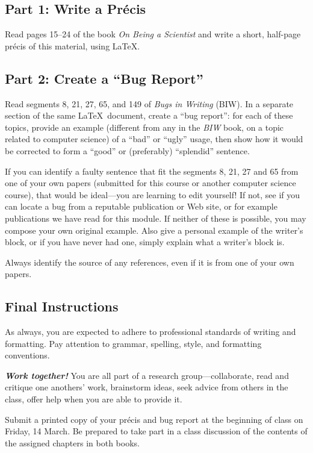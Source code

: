 
\usepackage[compact]{titlesec}




\subsection*{Part 1: Write a Pr\'{e}cis}
Read pages 15--24 of the book {\em On Being a Scientist} and write a short,
half-page pr\'{e}cis of this material, using \LaTeX.

\subsection*{Part 2: Create a ``Bug Report''}
Read segments 8, 21, 27, 65, and 149 of {\em Bugs in Writing} (BIW). 
In a separate section of the same \LaTeX\ document, create a
``bug report'': for each
of these topics, provide an example (different from any in the {\em BIW}
book, on a topic
related to computer science) of a ``bad'' or ``ugly'' usage, then show
how it would be corrected to form a ``good'' or (preferably) ``splendid''
sentence.

If you can identify a faulty sentence that fit the segments 8, 21, 27 and 65 from one of your own papers (submitted
for this course or another computer science course), that would be ideal---you
    are learning to edit yourself!
If not, see if you can locate a bug from a reputable publication or
Web site, or for example publications we have read for this module. If neither of these is possible, you may compose your own
original example. Also give a personal example of the writer's block, or if you have never had one, simply explain what a writer's block is. 

Always identify the source of any references, even if it is from one of your
own papers.

\subsection*{Final Instructions}
As always, 
you are expected to adhere to professional standards of writing and
formatting. Pay attention to grammar, spelling, style, and formatting
conventions.

{\large\color{blue}\textbf{\textit{Work together!}}} You are all part of a research group---collaborate,
read and critique one anothers' work, brainstorm ideas,
seek advice from others in the class, offer help when you are able 
to provide it.

Submit a printed copy of your pr\'{e}cis and bug report at the beginning 
of class on Friday, 14 March. Be prepared to take part in a
class discussion of the contents of the assigned chapters in both books.

